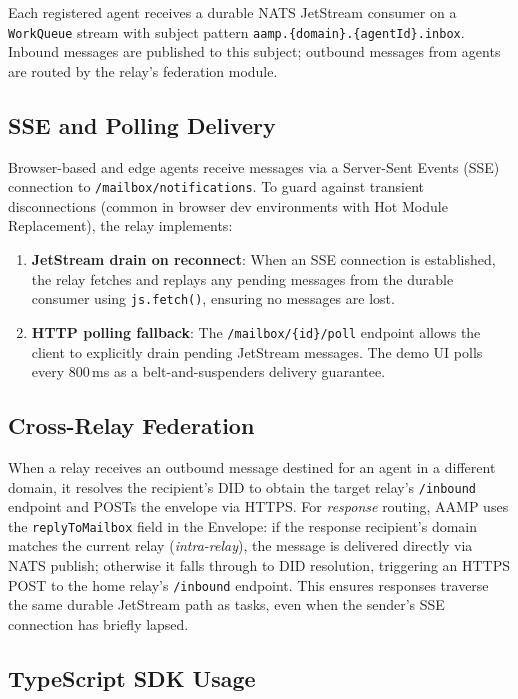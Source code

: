 \documentclass[11pt,a4paper]{article}
\begin{document}
Each registered agent receives a durable NATS JetStream consumer on a
\texttt{WorkQueue} stream with subject pattern
\texttt{aamp.\{domain\}.\{agentId\}.inbox}. Inbound messages are published to this
subject; outbound messages from agents are routed by the relay's federation module.

\subsection{SSE and Polling Delivery}

Browser-based and edge agents receive messages via a Server-Sent Events (SSE)
connection to \texttt{/mailbox/notifications}. To guard against transient
disconnections (common in browser dev environments with Hot Module Replacement),
the relay implements:

\begin{enumerate}[leftmargin=*]
  \item \textbf{JetStream drain on reconnect}: When an SSE connection is established,
    the relay fetches and replays any pending messages from the durable consumer
    using \texttt{js.fetch()}, ensuring no messages are lost.
  \item \textbf{HTTP polling fallback}: The \texttt{/mailbox/\{id\}/poll} endpoint
    allows the client to explicitly drain pending JetStream messages. The demo UI
    polls every 800\,ms as a belt-and-suspenders delivery guarantee.
\end{enumerate}

\subsection{Cross-Relay Federation}

When a relay receives an outbound message destined for an agent in a different domain,
it resolves the recipient's DID to obtain the target relay's \texttt{/inbound}
endpoint and POSTs the envelope via HTTPS. For \emph{response} routing, AAMP uses
the \texttt{replyToMailbox} field in the Envelope: if the response recipient's domain
matches the current relay (\emph{intra-relay}), the message is delivered directly via
NATS publish; otherwise it falls through to DID resolution, triggering an HTTPS POST
to the home relay's \texttt{/inbound} endpoint. This ensures responses traverse the
same durable JetStream path as tasks, even when the sender's SSE connection has
briefly lapsed.

\subsection{TypeScript SDK Usage}
\end{document}
